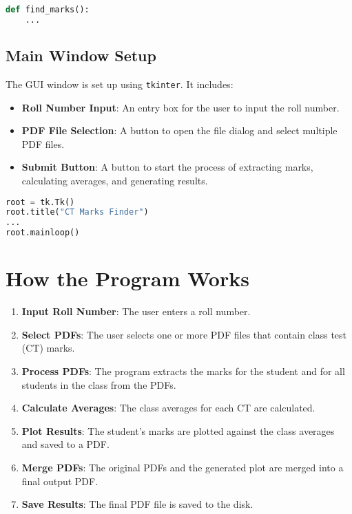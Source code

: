 \documentclass{article}
\begin{document}
\begin{lstlisting}[language=Python, caption=Main Function to Find Marks]
def find_marks():
    ...
\end{lstlisting}

\subsection{Main Window Setup}

The GUI window is set up using \texttt{tkinter}. It includes:
\begin{itemize}
    \item \textbf{Roll Number Input}: An entry box for the user to input the roll number.
    \item \textbf{PDF File Selection}: A button to open the file dialog and select multiple PDF files.
    \item \textbf{Submit Button}: A button to start the process of extracting marks, calculating averages, and generating results.
\end{itemize}

\begin{lstlisting}[language=Python, caption=Main Window Setup]
root = tk.Tk()
root.title("CT Marks Finder")
...
root.mainloop()
\end{lstlisting}

\section{How the Program Works}

\begin{enumerate}
    \item \textbf{Input Roll Number}: The user enters a roll number.
    \item \textbf{Select PDFs}: The user selects one or more PDF files that contain class test (CT) marks.
    \item \textbf{Process PDFs}: The program extracts the marks for the student and for all students in the class from the PDFs.
    \item \textbf{Calculate Averages}: The class averages for each CT are calculated.
    \item \textbf{Plot Results}: The student’s marks are plotted against the class averages and saved to a PDF.
    \item \textbf{Merge PDFs}: The original PDFs and the generated plot are merged into a final output PDF.
    \item \textbf{Save Results}: The final PDF file is saved to the disk.
\end{enumerate}
\end{document}
